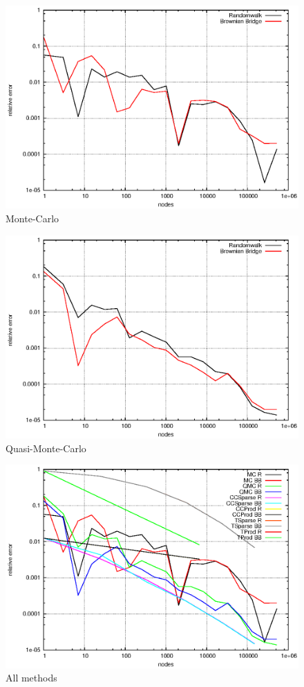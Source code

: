 \documentclass[]{article}
\begin{document}
\begin{figure}[!ht]
\centering
\includegraphics{task16_mc}
\caption{Monte-Carlo}
\label{fig:Task16e}
\end{figure}

\begin{figure}[!ht]
\centering
\includegraphics{task16_qmc}
\caption{Quasi-Monte-Carlo}
\label{fig:Task16f}
\end{figure}

\begin{figure}[!ht]
\centering
\includegraphics{task16}
\caption{All methods}
\label{fig:Task16g}
\end{figure}
\clearpage
\end{document}
